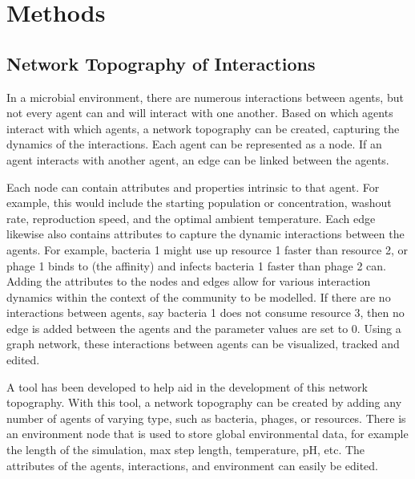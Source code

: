 \chapter{Methods}
\label{Methods}

\section{Network Topography of Interactions}
In a microbial environment, there are numerous interactions between agents, but not every agent can and will interact with one another.
Based on which agents interact with which agents, a network topography can be created, capturing the dynamics of the interactions.
Each agent can be represented as a node.
If an agent interacts with another agent, an edge can be linked between the agents.

Each node can contain attributes and properties intrinsic to that agent. 
For example, this would include the starting population or concentration, washout rate, reproduction speed, and the optimal ambient temperature. 
Each edge likewise also contains attributes to capture the dynamic interactions between the agents. 
For example, bacteria 1 might use up resource 1 faster than resource 2, or phage 1 binds to (the affinity) and infects bacteria 1 faster than phage 2 can. 
Adding the attributes to the nodes and edges allow for various interaction dynamics within the context of the community to be modelled. 
If there are no interactions between agents, say bacteria 1 does not consume resource 3, then no edge is added between the agents and the parameter values are set to 0. 
Using a graph network, these interactions between agents can be visualized, tracked and edited. \newline 

A tool has been developed to help aid in the development of this network topography.
With this tool, a network topography can be created by adding any number of agents of varying type, such as bacteria, phages, or resources.
There is an environment node that is used to store global environmental data, for example the length of the simulation, max step length, temperature, pH, etc.
The attributes of the agents, interactions, and environment can easily be edited. \newline 

